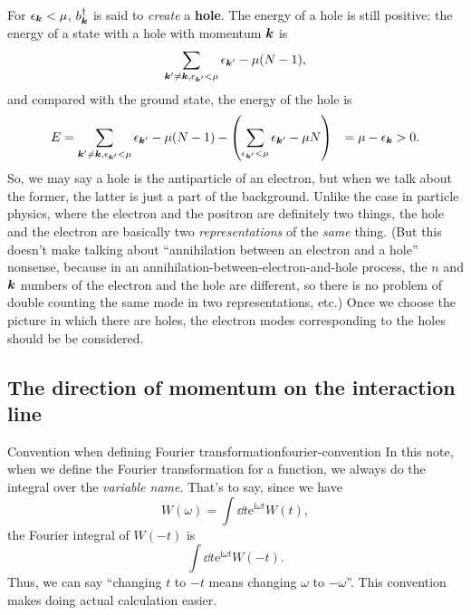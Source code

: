 \documentclass[hyperref, a4paper]{report}
\newcommand*{\ii}{\mathrm{i}}
\newcommand*{\ee}{\mathrm{e}}
\newcommand*{\concept}[1]{{\textbf{#1}}}
\def\\{}%
\begin{document}
For $\epsilon_{\vb*{k}} < \mu$, $b_{\vb*{k}}^\dagger$ is said to \emph{create} a \concept{hole}.
The energy of a hole is still positive:
the energy of a state with a hole with momentum $\vb*{k}$
is 
\[
    \sum_{\vb*{k}' \neq \vb*{k}, \epsilon_{\vb*{k}'} < \mu} \epsilon_{\vb*{k}'} - \mu (N - 1),
\]
and compared with the ground state, the energy of the hole is 
\begin{equation}
    \begin{aligned}
        E &= \sum_{\vb*{k}' \neq \vb*{k}, \epsilon_{\vb*{k}'} < \mu} \epsilon_{\vb*{k}'} - \mu (N - 1) 
        - \left( \sum_{\epsilon_{\vb*{k}'} < \mu} \epsilon_{\vb*{k}'} - \mu N \right) \\
        &= \mu - \epsilon_{\vb*{k}} > 0.
    \end{aligned}
\end{equation}
So, we may say a hole is the antiparticle of an electron,
but when we talk about the former, 
the latter is just a part of the background.
Unlike the case in particle physics,
where the electron and the positron are definitely two things,
the hole and the electron are basically two \emph{representations} of the \emph{same} thing.
(But this doesn't make talking about ``annihilation between an electron and a hole'' nonsense,
because in an annihilation-between-electron-and-hole process,
the $n$ and $\vb*{k}$ numbers of the electron and the hole are different,
so there is no problem of double counting the same mode in two representations, etc.)
Once we choose the picture in which there are holes, 
the electron modes corresponding to the holes should be be considered.

\subsection{The direction of momentum on the interaction line}\label{sec:gw-bse.preliminaries.diagram.direction-line}

\begin{infobox}{Convention when defining Fourier transformation}{fourier-convention}
    In this note, when we define the Fourier transformation for a function,
    we always do the integral over the \emph{variable name}.
    That's to say, 
    since we have 
    \[
        W(\omega) = \int \dd{t} \ee^{\ii \omega t} W(t),
    \]
    the Fourier integral of $W(-t)$ is 
    \[
        \int \dd{t} \ee^{\ii \omega t} W(-t).
    \]
    Thus, we can say ``changing $t$ to $-t$ means changing $\omega$ to $- \omega$''.
    This convention makes doing actual calculation easier.
\end{infobox}
\end{document}
